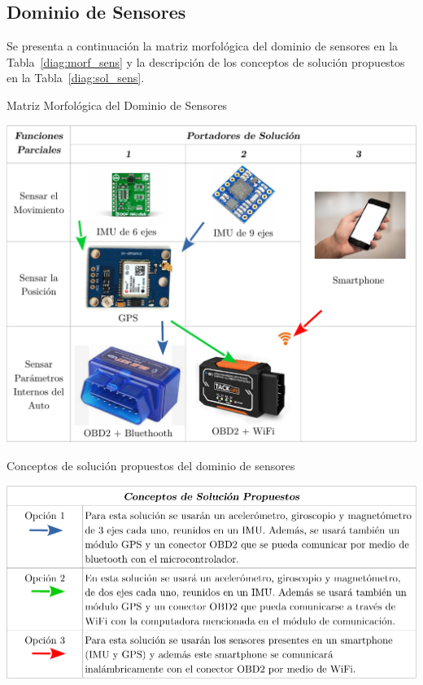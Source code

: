 \subsection{Dominio de Sensores}
Se presenta a continuación la matriz morfológica del dominio de sensores en la Tabla~\ref{diag:morf_sens} y la descripción de los conceptos de solución propuestos en la Tabla~\ref{diag:sol_sens}.
\begin{table}[htbp!]
  \caption{Matriz Morfológica del Dominio de Sensores}
  \label{diag:morf_sens}
  \centering
  \includegraphics[width=0.9\linewidth]{morf_sens.pdf}
\end{table}

\newpage

\begin{table}[htbp!]
  \caption{Conceptos de solución propuestos del dominio de sensores}
  \label{diag:sol_sens}
  \includegraphics[width=\linewidth]{sol_sens.pdf}
\end{table}


